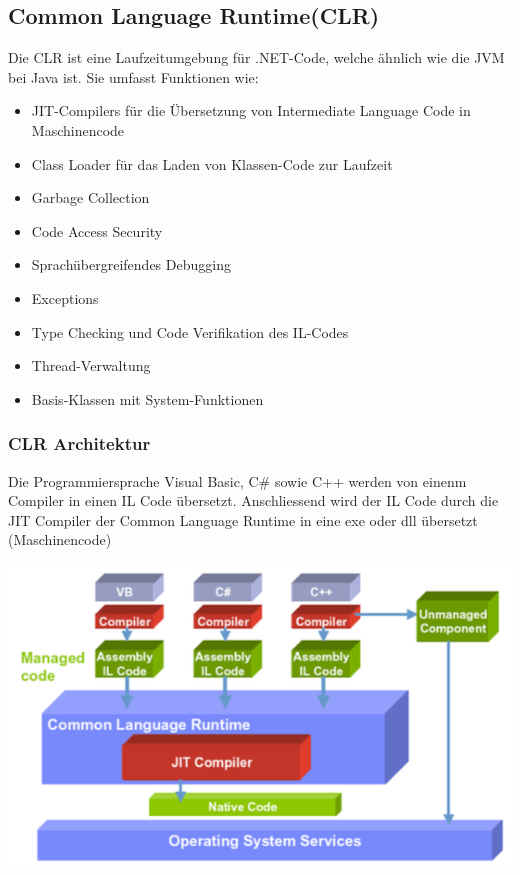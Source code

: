 \subsection{Common Language Runtime(CLR)}
Die CLR ist eine Laufzeitumgebung für .NET-Code, welche ähnlich wie die JVM bei Java ist. Sie umfasst Funktionen wie:\\
\begin{multicols}{2}
\begin{itemize}
    \item JIT-Compilers für die Übersetzung von Intermediate Language Code in Maschinencode
    \item Class Loader für das Laden von Klassen-Code zur Laufzeit
    \item Garbage Collection
    \item Code Access Security
    \item Sprachübergreifendes Debugging
    \item Exceptions
    \item Type Checking und Code Verifikation des IL-Codes
    \item Thread-Verwaltung
    \item Basis-Klassen mit System-Funktionen
\end{itemize}
\end{multicols}

\subsubsection{CLR Architektur}
Die Programmiersprache Visual Basic, C\# sowie C++ werden von einenm Compiler in einen IL Code übersetzt.
Anschliessend wird der IL Code durch die JIT Compiler der Common Language Runtime in eine exe oder dll übersetzt (Maschinencode)
\vspace{-8pt}
\begin{center}
\includegraphics[scale=0.3]{graphic/grundlagen/Grundlagen_CLR Architetktur}
\end{center}

